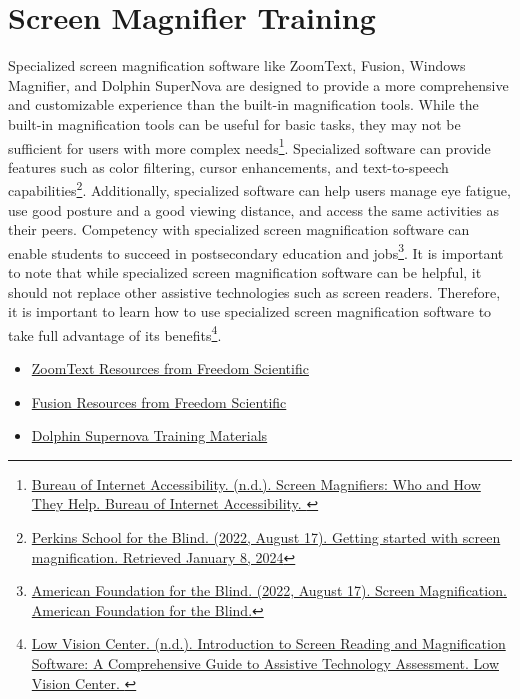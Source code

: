 \pagebreak\hypertarget{appx11}{}\section[Screen Magnifier Training]{Screen Magnifier Training}\label{appx11}
Specialized screen magnification software like ZoomText, Fusion, Windows Magnifier, and Dolphin SuperNova are designed to provide a more comprehensive and customizable experience than the built-in magnification tools. While the built-in magnification tools can be useful for basic tasks, they may not be sufficient for users with more complex needs\footnote{\raggedright \href{https://www.boia.org/blog/screen-magnifiers-who-and-how-they-help}{Bureau of Internet Accessibility. (n.d.). Screen Magnifiers: Who and How They Help. Bureau of Internet Accessibility. }}. Specialized software can provide features such as color filtering, cursor enhancements, and text-to-speech capabilities\footnote{\raggedright \href{https://www.perkins.org/resource/getting-started-screen-magnification/}{Perkins School for the Blind. (2022, August 17). Getting started with screen magnification. Retrieved January 8, 2024}}. Additionally, specialized software can help users manage eye fatigue, use good posture and a good viewing distance, and access the same activities as their peers. Competency with specialized screen magnification software can enable students to succeed in postsecondary education and jobs\footnote{\raggedright \href{https://www.afb.org/blindness-and-low-vision/using-technology/screen-magnification}{American Foundation for the Blind. (2022, August 17). Screen Magnification. American Foundation for the Blind.}}. It is important to note that while specialized screen magnification software can be helpful, it should not replace other assistive technologies such as screen readers. Therefore, it is important to learn how to use specialized screen magnification software to take full advantage of its benefits\footnotemark[\value{footnote}]\fnsep\footnote{\raggedright \href{https://nelowvision.com/introduction-to-screen-reading-and-magnification-software-a-comprehensive-guide-to-assistive-technology-assessment/}{Low Vision Center. (n.d.). Introduction to Screen Reading and Magnification Software: A Comprehensive Guide to Assistive Technology Assessment. Low Vision Center. }}.
\begin{itemize}[leftmargin=*]
 \item \href{https://support.freedomscientific.com/teachers/resources/ZoomText\_resources.zip}{ZoomText Resources from Freedom Scientific} 
 \item \href{https://support.freedomscientific.com/teachers/resources/Fusion\_resources.zip}{Fusion Resources from Freedom Scientific} 
 \item \href{https://yourdolphin.com/support/tutorials}{Dolphin Supernova Training Materials} 
\end{itemize}

